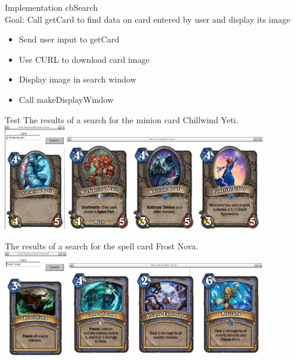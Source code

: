 \documentclass[aspectratio=169]{beamer}
\begin{document}
\begin{frame}[allowframebreaks]{Implementation}
cbSearch \\
Goal: Call getCard to find data on card entered by user and display its image
\begin{itemize}
\item Send user input to getCard
\item Use CURL to download card image
\item Display image in search window
\item Call makeDisplayWindow
\end{itemize}

\end{frame}

\begin{frame}[allowframebreaks]{Test}
The results of a search for the minion card Chillwind Yeti.
\\
\includegraphics[height=1.8in]{yeti}
\includegraphics[height=1.6in]{yetiresults}

\pagebreak

The results of a search for the spell card Frost Nova.
\\
\includegraphics[height=1.8in]{nova}
\includegraphics[height=1.6in]{novaresults}


\end{frame}
\end{document}
